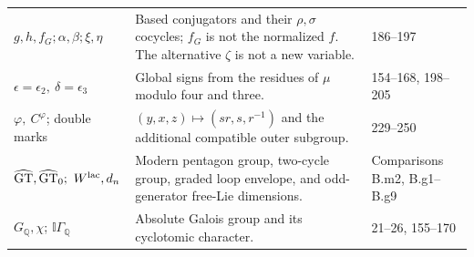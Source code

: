 \begin{center}
\begin{tabularx}{\textwidth}{p{}Xp{}}
$g,h,f_G;\alpha,\beta;\xi,\eta$&Based conjugators and their $\rho,\sigma$ cocycles; $f_G$ is not the normalized $f$. The alternative $\zeta$ is not a new variable.&186--197\\
$\epsilon=\epsilon_2,\ \delta=\epsilon_3$&Global signs from the residues of $\mu$ modulo four and three.&154--168, 198--205\\
$\varphi,\ C^\varphi$; double marks&$(y,x,z)\mapsto(sr,s,r^{-1})$ and the additional compatible outer subgroup.&229--250\\
$\GT,\GTz;\ W^{\rm lac},d_n$&Modern pentagon group, two-cycle group, graded loop envelope, and odd-generator free-Lie dimensions.&Comparisons B.m2, B.g1--B.g9\\
$G_\mathbb Q,\chi$; $\mathbb I\Gamma_\mathbb Q$&Absolute Galois group and its cyclotomic character.&21--26, 155--170\\
\bottomrule
\end{tabularx}
\endgroup
\end{center}
